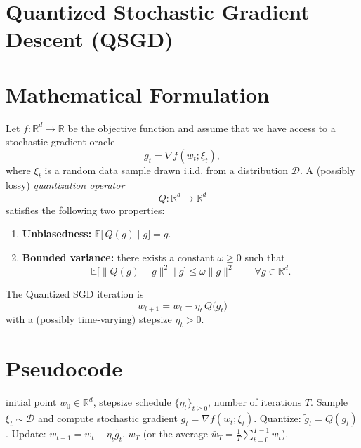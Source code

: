 \documentclass{article}
\newcommand{\E}{\mathbb{E}}
\newcommand{\R}{\mathbb{R}}
\begin{document}
\section*{Quantized Stochastic Gradient Descent (QSGD)}

\section*{Mathematical Formulation}
Let $f:\R^{d}\rightarrow\R$ be the objective function and assume that we have access to a stochastic gradient oracle
\[
g_{t}= \nabla f(w_{t};\xi_{t}),
\]
where $\xi_{t}$ is a random data sample drawn i.i.d. from a distribution $\mathcal{D}$.  
A (possibly lossy) \emph{quantization operator}
\[
Q:\R^{d}\rightarrow\R^{d}
\]
satisfies the following two properties:

\begin{enumerate}
\item \textbf{Unbiasedness:} \(\displaystyle \E\!\big[\,Q(g)\mid g\big]=g.\)
\item \textbf{Bounded variance:} there exists a constant \(\omega\ge 0\) such that
\[
\E\!\big[\|Q(g)-g\|^{2}\mid g\big]\le \omega\|g\|^{2}\qquad\forall g\in\R^{d}.
\]
\end{enumerate}

The Quantized SGD iteration is
\[
\boxed{w_{t+1}=w_{t}-\eta_{t}\,Q\!\big(g_{t}\big)}\tag{1}
\]
with a (possibly time‑varying) stepsize \(\eta_{t}>0\).

\section*{Pseudocode}
\begin{algorithm}[H]
\caption{Quantized Stochastic Gradient Descent (QSGD)}
\begin{algorithmic}[1]
 initial point $w_{0}\in\R^{d}$, stepsize schedule $\{\eta_{t}\}_{t\ge0}$, number of iterations $T$.
    \STATE Sample $\xi_{t}\sim\mathcal{D}$ and compute stochastic gradient $g_{t}= \nabla f(w_{t};\xi_{t})$.
    \STATE Quantize: $\tilde g_{t}= Q(g_{t})$.
    \STATE Update: $w_{t+1}= w_{t}-\eta_{t}\tilde g_{t}$.
\ENDFOR
{} $w_{T}$ (or the average $\bar w_{T}= \frac1T\sum_{t=0}^{T-1}w_{t}$).
\end{algorithmic}
\end{algorithm}
\end{document}
